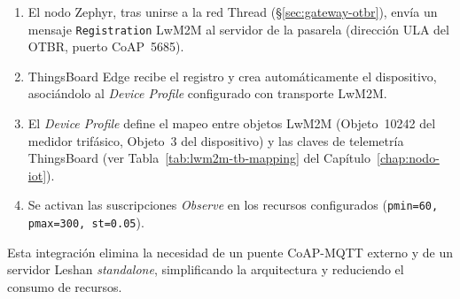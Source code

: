 \begin{enumerate}
    \item El nodo Zephyr, tras unirse a la red Thread (§\ref{sec:gateway-otbr}), envía un mensaje \texttt{Registration} LwM2M al servidor de la pasarela (dirección ULA del OTBR, puerto CoAP~5685).
    \item ThingsBoard Edge recibe el registro y crea automáticamente el dispositivo, asociándolo al \emph{Device Profile} configurado con transporte LwM2M.
    \item El \emph{Device Profile} define el mapeo entre objetos LwM2M (Objeto~10242 del medidor trifásico, Objeto~3 del dispositivo) y las claves de telemetría ThingsBoard (ver Tabla~\ref{tab:lwm2m-tb-mapping} del Capítulo~\ref{chap:nodo-iot}).
    \item Se activan las suscripciones \emph{Observe} en los recursos configurados (\texttt{pmin=60, pmax=300, st=0.05}).
\end{enumerate}

Esta integración elimina la necesidad de un puente CoAP-MQTT externo y de un servidor Leshan \emph{standalone}, simplificando la arquitectura y reduciendo el consumo de recursos.

\begin{table}[H]
\centering
\caption{Comparación de arquitecturas de recepción LwM2M en el borde}
\label{tab:lwm2m-transport-comparison}
%
\end{table}

